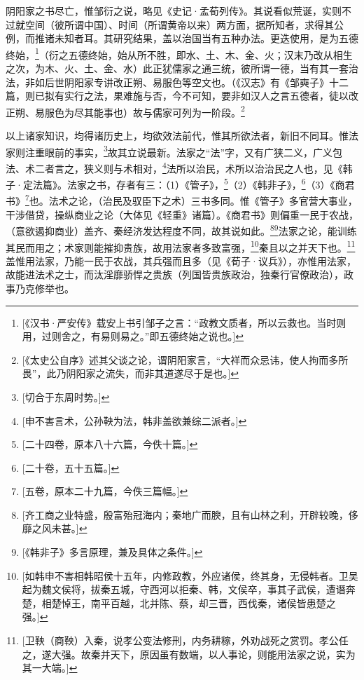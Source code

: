 阴阳家之书尽亡，惟邹衍之说，略见《史记·孟荀列传》。其说看似荒诞，实则不过就空间（彼所谓中国）、时间（所谓黄帝以来）两方面，据所知者，求得其公例，而推诸未知者耳。其研究结果，盖以治国当有五种办法。更迭使用，是为五德终始，\footnote{[《汉书·严安传》载安上书引邹子之言：“政教文质者，所以云救也。当时则用，过则舍之，有易则易之。”即五德终始之说也。]}（衍之五德终始，始从所不胜，即水、土、木、金、火；汉末乃改从相生之次，为木、火、土、金、水）此正犹儒家之通三统，彼所谓一德，当有其一套治法，非如后世阴阳家专讲改正朔、易服色等空文也。（《汉志》有《邹奭子》十二篇，则已拟有实行之法，果难施与否，今不可知，要非如汉人之言五德者，徒以改正朔、易服色为尽其能事也）故与儒家可列为一阶段。\footnote{[《太史公自序》述其父谈之论，谓阴阳家言，“大祥而众忌讳，使人拘而多所畏”，此乃阴阳家之流失，而非其道遂尽于是也。]}

以上诸家知识，均得诸历史上，均欲效法前代，惟其所欲法者，新旧不同耳。惟法家则注重眼前的事实，\footnote{[切合于东周时势。]}故其立说最新。法家之“法”字，又有广狭二义，广义包法、术二者言之，狭义则与术相对，\footnote{[申不害言术，公孙鞅为法，韩非盖欲兼综二派者。]}法所以治民，术所以治治民之人也，见《韩子·定法篇》。法家之书，存者有三：（1）《管子》，\footnote{[二十四卷，原本八十六篇，今佚十篇。]}（2）《韩非子》，\footnote{[二十卷，五十五篇。]}（3）《商君书》\footnote{[五卷，原本二十九篇，今佚三篇幅。]}也。法术之论，（治民及驭臣下之术）三书多同。惟《管子》多官营大事业，干涉借贷，操纵商业之论（大体见《轻重》诸篇）。《商君书》则偏重一民于农战，（意欲遏抑商业）盖齐、秦经济发达程度不同，故其说如此。\footnote{[齐工商之业特盛，殷富殆冠海内；秦地广而腴，且有山林之利，开辟较晚，侈靡之风未甚。]}\footnote{[《韩非子》多言原理，兼及具体之条件。]}法家之论，能训练其民而用之；术家则能摧抑贵族，故用法家者多致富强，\footnote{[如韩申不害相韩昭侯十五年，内修政教，外应诸侯，终其身，无侵韩者。卫吴起为魏文侯将，拔秦五城，守西河以拒秦、韩，文侯卒，事其子武侯，遭谮奔楚，相楚悼王，南平百越，北并陈、蔡，却三晋，西伐秦，诸侯皆患楚之强。]}秦且以之并天下也。\footnote{[卫鞅（商鞅）入秦，说孝公变法修刑，内务耕稼，外劝战死之赏罚。孝公任之，遂大强。故秦并天下，原因虽有数端，以人事论，则能用法家之说，实为其一大端。]}盖惟用法家，乃能一民于农战，其兵强而且多（见《荀子·议兵》），亦惟用法家，故能进法术之士，而汰淫靡骄悍之贵族（列国皆贵族政治，独秦行官僚政治），政事乃克修举也。
